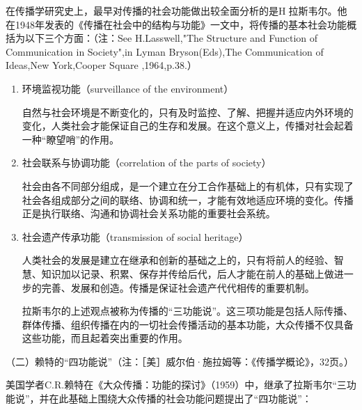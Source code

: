 \documentclass[UTF8,12pt]{ctexart}
\numberwithin{equation}{section} %
\numberwithin{figure}{section}
\numberwithin{table}{section}
\begin{document}
	在传播学研究史上，最早对传播的社会功能做出较全面分析的是H拉斯韦尔。他在1948年发表的《传播在社会中的结构与功能》一文中，将传播的基本社会功能概括为以下三个方面：（注：See H.Lasswell,"The Structure and Function of Communication in Society",in Lyman Bryson(Eds),The Communication of Ideas,New York,Cooper Square ,1964,p.38.）
	\begin{enumerate}
		\item 环境监视功能（surveillance of the environment）
		
		自然与社会环境是不断变化的，只有及时监控、了解、把握并适应内外环境的变化，人类社会才能保证自己的生存和发展。在这个意义上，传播对社会起着一种“瞭望哨”的作用。
		
		\item 社会联系与协调功能（correlation of the parts of society）
		
		社会由各不同部分组成，是一个建立在分工合作基础上的有机体，只有实现了社会各组成部分之间的联络、协调和统一，才能有效地适应环境的变化。传播正是执行联络、沟通和协调社会关系功能的重要社会系统。
		
		\item 社会遗产传承功能（transmission of social heritage）
		
		人类社会的发展是建立在继承和创新的基础之上的，只有将前人的经验、智慧、知识加以记录、积累、保存并传给后代，后人才能在前人的基础上做进一步的完善、发展和创造。传播是保证社会遗产代代相传的重要机制。
		
		拉斯韦尔的上述观点被称为传播的“三功能说”。这三项功能是包括人际传播、群体传播、组织传播在内的一切社会传播活动的基本功能，大众传播不仅具备这些功能，而且起着突出重要的作用。
	\end{enumerate}
	
	
	
	（二）赖特的“四功能说”（注：［美］威尔伯·施拉姆等：《传播学概论》，32页。）
	
	美国学者C.R.赖特在《大众传播：功能的探讨》（1959）中，继承了拉斯韦尔“三功能说”，并在此基础上围绕大众传播的社会功能问题提出了“四功能说”：
	
\end{document}
